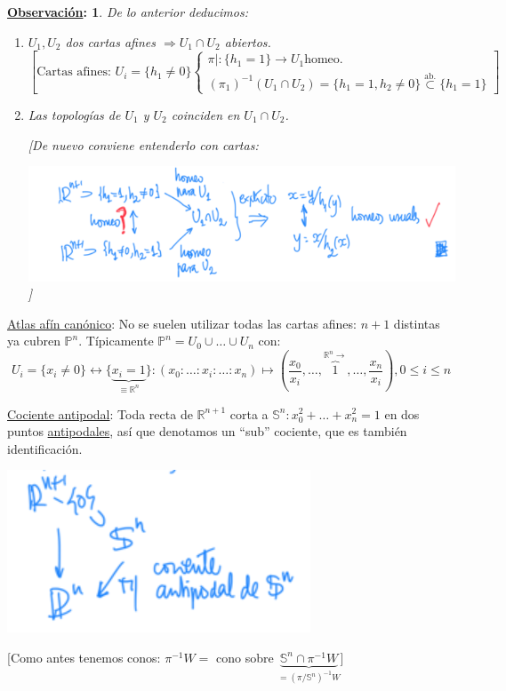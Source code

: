 \documentclass[10pt,a4paper,openright]{book}
\theoremstyle{break}
\newtheorem*{obs}{\underline{Observación}:}
\begin{document}
\begin{obs}
De lo anterior deducimos:
\begin{enumerate}
    \item $U_1, U_2$ dos cartas afines $\Rightarrow U_1 \cap U_2$ abiertos.
    \[
    \left[ \text{Cartas afines: } U_i = \{h_1 \neq 0\} \begin{cases}
        \pi|: \{h_1 = 1\} \rightarrow U_1 \text{homeo.}\\
        \left( \pi_1 \right)^{-1}\left( U_1 \cap U_2 \right) = \{h_1 = 1, h_2 \neq 0\} \stackrel{\text{ab.}}{\subset} \{h_1 = 1\}  
    \end{cases} \right] 
    \]
    \item Las topologías de $U_1$ y $U_2$ coinciden en $U_1 \cap U_2$.

    [De nuevo conviene entenderlo con cartas:
    \begin{center}
        \includegraphics[scale=0.3]{images/obs_cartas_afines} ]
    \end{center}
\end{enumerate}
\end{obs}

\underline{Atlas afín canónico}: No se suelen utilizar todas las cartas afines: $n + 1$ distintas ya cubren $\mathbb{P}^{n}$. Típicamente $\mathbb{P}^{n} = U_0 \cup \ldots \cup U_n$ con:
\[
U_i = \{x_i \neq 0\} \leftrightarrow \{\underbrace{x_i = 1}_{\equiv \mathbb{R}^n}\}: \left( x_0 : \ldots : x_i : \ldots : x_n \right) \mapsto \left( \frac{x_0}{x_i}, \ldots, \overbrace{1}^{\mathbb{R}^n \rightarrow}, \ldots, \frac{x_n}{x_i} \right), 0 \le i \le n
\]

\underline{Cociente antipodal}: Toda recta de $\mathbb{R}^{n + 1}$ corta a $\mathbb{S}^{n}: x_0^2 + \ldots + x_n^2 = 1$ en dos puntos \underline{antipodales}, así que denotamos un ``sub'' cociente, que es también identificación.
\begin{center}
    \includegraphics[scale=0.3]{images/cociente_antipodal} 

    [Como antes tenemos conos: $\pi^{-1}W = $ cono sobre $\underbrace{\mathbb{S}^n \cap \pi^{-1}W}_{= \left( \pi / \mathbb{S}^n \right)^{-1} W}$]
\end{center}
\end{document}
